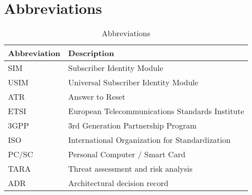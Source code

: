\chapter{Abbreviations}

\begin{table}[ht!]
    \centering
    \caption{Abbreviations}
    \label{tab:abbreviations}
    \begin{tabular}{|l|l|}
        \hline
        \rowcolor{lightgray}
        \textbf{Abbreviation} & \textbf{Description}           \\ \hline
        SIM & Subscriber Identity Module                       \\ \hline
        USIM & Universal Subscriber Identity Module            \\ \hline
        ATR & Answer to Reset                                  \\ \hline
        ETSI & European Telecommunications Standards Institute \\ \hline
        3GPP & 3rd Generation Partnership Program              \\ \hline
        ISO & International Organization for Standardization   \\ \hline
        PC/SC & Personal Computer / Smart Card                 \\ \hline
        TARA & Threat assessment and risk analysis             \\ \hline
        ADR & Architectural decision record                    \\ \hline
    \end{tabular}
\end{table}
